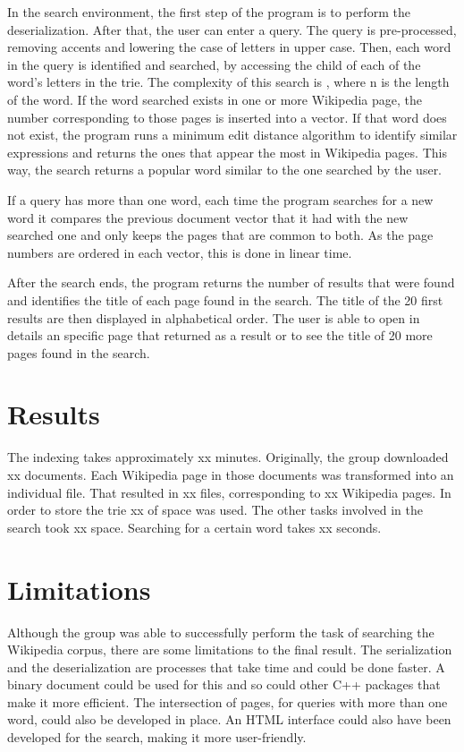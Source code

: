 \documentclass{article}
\begin{document}
In the search environment, the first step of the program is to perform the deserialization. After that, the user can enter a query.  The query is pre-processed, removing accents and lowering the case of letters in upper case. Then, each word in the query is identified and searched, by accessing the child of each of the word's letters in the trie. The complexity of this search is , where n is the length of the word. If the word searched exists in one or more Wikipedia page, the number corresponding to those pages is inserted into a vector. If that word does not exist, the program runs a minimum edit distance algorithm to identify similar expressions and returns the ones that appear the most in Wikipedia pages. This way, the search returns a popular word similar to the one searched by the user. 

If a query has more than one word, each time the program searches for a new word it compares the previous document vector that it had with the new searched one and only keeps the pages that are common to both. As the page numbers are ordered in each vector, this is done in linear time. 

After the search ends, the program returns the number of results that were found and identifies the title of each page found in the search. The title of the 20 first results are then displayed in alphabetical order. The user is able to open in details an specific page that returned as a result or to see the title of 20 more pages found in the search. 


\section*{Results}
The indexing takes approximately xx minutes. Originally, the group downloaded xx documents. Each Wikipedia page in those documents was transformed into an individual file. That resulted in xx files, corresponding to xx Wikipedia pages. In order to store the trie xx of space was used. The other tasks involved in the search took xx space. Searching for a certain word takes xx seconds. 

\section*{Limitations}
Although the group was able to successfully perform the task of searching the Wikipedia corpus, there are some limitations to the final result. The serialization and the deserialization are processes that take time and could be done faster. A binary document could be used for this and so could other C++ packages that make it more efficient. The intersection of pages, for queries with more than one word, could also be developed in place. An HTML interface could also have been developed for the search, making it more user-friendly.
\end{document}
